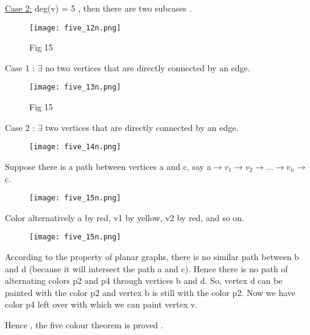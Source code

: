 \documentclass[12pt]{beamer}
\begin{document}
\begin{frame}
\underline{\large{Case 2:}} deg(v) = 5 , then there are two subcases .\newline \newline
\begin{figure}
\texttt{[image: five\_12n.png]}
\caption{Fig 15}
\end{figure}
\end{frame}

\begin{frame}
Case 1 : $\exists$ no two vertices that are directly connected by an edge.
\begin{figure}
\texttt{[image: five\_13n.png]}
\caption{Fig 15}
\end{figure}
\end{frame}

\begin{frame}
Case 2 : $\exists$ two vertices that are directly connected by an edge.
\begin{figure}
\texttt{[image: five\_14n.png]}
\end{figure}
Suppose there is a path between vertices a and c, say a$\rightarrow v_1
\rightarrow v_2 \rightarrow ... \rightarrow v_n \rightarrow$ c.
\end{frame}




\begin{frame}
\begin{figure}
\texttt{[image: five\_15n.png]}
\end{figure}
Color alternatively a by red, v1 by yellow, v2 by red, and so on.
\end{frame}

\begin{frame}
\begin{figure}
\texttt{[image: five\_15n.png]}
\end{figure}
\end{frame}

\begin{frame}
According to the property of planar graphs, there is no similar path between b and d (because it will intersect the path a and c). Hence there is no path of alternating colors p2 and p4 through vertices b and d. So, vertex d can be painted with the color p2 and vertex b is still with the color p2. Now we have color p4 left over with which we can paint vertex v.\newline

\Large{Hence , the five colour theorem is proved .}
\end{frame}
\end{document}
